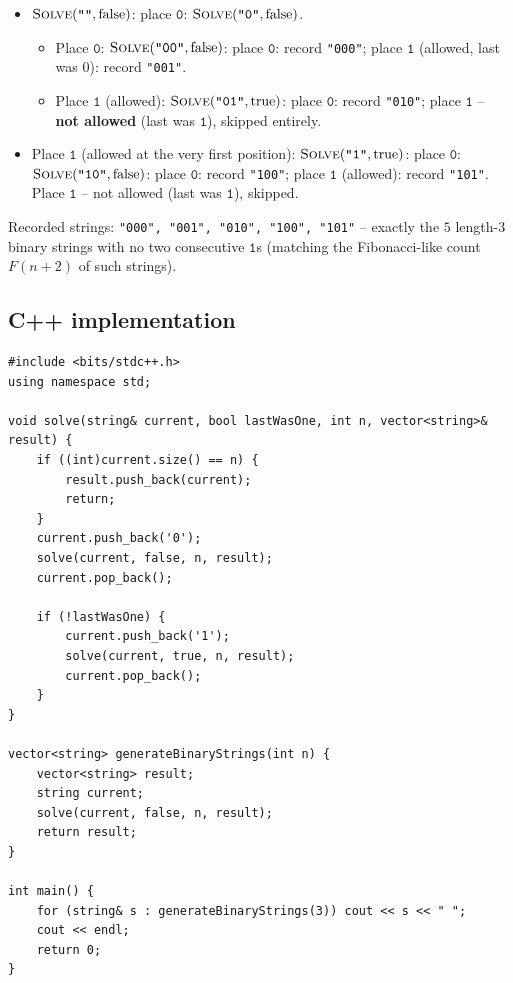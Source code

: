 \begin{itemize}
  \item $\textsc{Solve}(\texttt{""}, \text{false})$: place
        $\texttt{0}$: $\textsc{Solve}(\texttt{"0"}, \text{false})$.
  \begin{itemize}
    \item Place $\texttt{0}$: $\textsc{Solve}(\texttt{"00"},
          \text{false})$: place $\texttt{0}$: record \texttt{"000"};
          place $\texttt{1}$ (allowed, last was $0$): record
          \texttt{"001"}.
    \item Place $\texttt{1}$ (allowed): $\textsc{Solve}(\texttt{"01"},
          \text{true})$: place $\texttt{0}$: record \texttt{"010"};
          place $\texttt{1}$ -- \textbf{not allowed} (last was
          $\texttt{1}$), skipped entirely.
  \end{itemize}
  \item Place $\texttt{1}$ (allowed at the very first position):
        $\textsc{Solve}(\texttt{"1"}, \text{true})$: place $\texttt{0}$:
        $\textsc{Solve}(\texttt{"10"}, \text{false})$: place
        $\texttt{0}$: record \texttt{"100"}; place $\texttt{1}$
        (allowed): record \texttt{"101"}. Place $\texttt{1}$ -- not
        allowed (last was $\texttt{1}$), skipped.
\end{itemize}

Recorded strings: \texttt{"000", "001", "010", "100", "101"} -- exactly
the $5$ length-$3$ binary strings with no two consecutive $\texttt{1}$s
(matching the Fibonacci-like count $F(n+2)$ of such strings).

\subsection*{C++ implementation}

\begin{lstlisting}
#include <bits/stdc++.h>
using namespace std;

void solve(string& current, bool lastWasOne, int n, vector<string>& result) {
    if ((int)current.size() == n) {
        result.push_back(current);
        return;
    }
    current.push_back('0');
    solve(current, false, n, result);
    current.pop_back();

    if (!lastWasOne) {
        current.push_back('1');
        solve(current, true, n, result);
        current.pop_back();
    }
}

vector<string> generateBinaryStrings(int n) {
    vector<string> result;
    string current;
    solve(current, false, n, result);
    return result;
}

int main() {
    for (string& s : generateBinaryStrings(3)) cout << s << " ";
    cout << endl;
    return 0;
}
\end{lstlisting}

